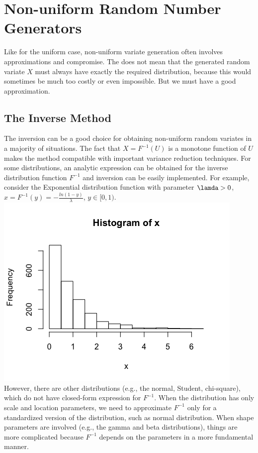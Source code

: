 \documentclass[a4paper,11pt]{article}
\begin{document}
\section{Non-uniform Random Number Generators}
{Like for the uniform case, non-uniform variate generation often involves approximations and compromise. The does not mean that the generated random variate $X$ must
always have exactly the required distribution, because this would sometimes be much too costly or even impossible. But we must have a good approximation. 
\subsection{The Inverse Method}
{The inversion can be a good choice for obtaining non-uniform random variates in a majority of situations. The fact that $X=F^{-1}(U)$ is a monotone function of $U$ makes the method
compatible with important variance reduction techniques. For some distributions, an analytic expression can be obtained for the inverse distribution function $F^{-1}$ and inversion 
can be easily implemented. For example, consider the Exponential distribution function with parameter $\lamda > 0$, $x=F^{-1}(y)=-\frac{ln(1-y)}{\lambda}$, $y\in[0,1)$. \\
\includegraphics[scale=0.8]{in}\\
However, there are other distributions (e.g., the normal, Student, chi-square), which do not have closed-form expression for $F^{-1}$.  When the distribution has only scale and location parameters, we need to approximate $F^{-1}$ only for a standardized version of the distribution, such as normal distribution. When shape parameters are involved (e.g., the gamma and beta distributions), things are more complicated because  $F^{-1}$ depends on the parameters in a more fundamental manner.\\
}
}
\end{document}
